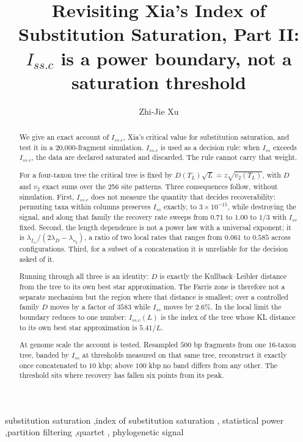 \documentclass[preprint,12pt,authoryear]{elsarticle}
\newcommand{\Iss}{I_{ss}}
\newcommand{\Issc}{I_{ss.c}}
\newcommand{\TL}{T_L}
\newcommand{\lam}[1]{\lambda_{#1}}
\theoremstyle{definition}
\theoremstyle{remark}
\begin{document}
\linenumbers

\begin{frontmatter}

\title{Revisiting Xia's Index of Substitution Saturation, Part II:\\
       $\Issc$ is a power boundary, not a saturation threshold}

\author[dhu]{Zhi-Jie Xu}

\address[dhu]{College of Biological Science \& Medical Engineering, Donghua
University, Shanghai 201620, China}

\begin{abstract}
We give an exact account of $\Issc$, Xia's critical value for substitution
saturation, and test it in a 20,000-fragment simulation.
$\Issc$ is used as a decision rule: when $\Iss$ exceeds $\Issc$, the data are
declared saturated and discarded. The rule cannot carry that weight.

For a four-taxon tree the critical tree is fixed by
$D(\TL)\sqrt L=z\sqrt{v_2(\TL)}$, with $D$ and $v_2$ exact sums
over the 256 site patterns. Three consequences follow, without simulation.
First, $\Issc$ does not measure the quantity that decides recoverability:
permuting taxa within columns preserves $\Iss$ exactly, to
$3\times10^{-15}$, while destroying the signal, and along that
family the recovery rate sweeps from $0.71$ to $1.00$ to $1/3$ with $\Iss$
fixed. Second, the length dependence is not a power law with a universal
exponent; it is $\lam{\Iss}/(2\lam D-\lam{v_2})$, a ratio of two local
rates that ranges from $0.061$ to $0.585$ across configurations. Third, for a
subset of a concatenation it is unreliable for the decision asked of it.

Running through all three is an identity: $D$ is exactly the
Kullback--Leibler distance from the tree to its own best star approximation.
The Farris zone is therefore not a separate mechanism but the region where
that distance is smallest; over a controlled family $D$ moves by a factor of $3583$
while $\Iss$ moves by $2.6\%$. In the local limit the boundary reduces to one
number: $\Issc(L)$ is the index of the tree whose KL distance to its own best
star approximation is $5.41/L$.

At genome scale the account is tested. Resampled $500$ bp fragments from one
$16$-taxon tree, banded by $\Iss$ at thresholds measured on that same tree,
reconstruct it exactly once concatenated to $10$ kbp; above $100$ kbp no band differs from any other. The
threshold sits where recovery has fallen six points from its peak.
\end{abstract}

\begin{keyword}
substitution saturation \sep index of substitution saturation \sep
statistical power \sep partition filtering \sep quartet \sep
phylogenetic signal
\end{keyword}

\end{frontmatter}
\end{document}
